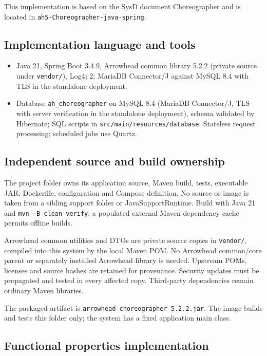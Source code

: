 \documentclass[a4paper]{arrowhead}
\begin{document}
This implementation is based on the SysD document Choreographer \cite{cho-sysd} and is located in \texttt{ah5-Choreographer-java-spring}.

\subsection{Implementation language and tools}
\begin{itemize}
\item Java 21, Spring Boot 3.4.9, Arrowhead common library 5.2.2 (private source under \texttt{vendor/}), Log4j 2; MariaDB Connector/J against MySQL 8.4 with TLS in the standalone deployment.
\item Database \texttt{ah\_\allowbreak{}choreographer} on MySQL 8.4 (MariaDB Connector/J, TLS with server verification in the standalone deployment), schema validated by Hibernate; SQL scripts in \texttt{src/\allowbreak{}main/\allowbreak{}resources/\allowbreak{}database}. Stateless request processing; scheduled jobs use Quartz.
\end{itemize}

\subsection{Independent source and build ownership}
The project folder owns its application source, Maven build, tests, executable JAR, Dockerfile, configuration and Compose definition. No source or image is taken from a sibling support folder or JavaSupportRuntime. Build with Java 21 and \texttt{mvn -B clean verify}; a populated external Maven dependency cache permits offline builds.

Arrowhead common utilities and DTOs are private source copies in \texttt{vendor/}, compiled into this system by the local Maven POM. No Arrowhead common/core parent or separately installed Arrowhead library is needed. Upstream POMs, licenses and source hashes are retained for provenance. Security updates must be propagated and tested in every affected copy. Third-party dependencies remain ordinary Maven libraries.

The packaged artifact is \texttt{arrowhead-\allowbreak{}choreographer-5.2.2.jar}. The image builds and tests this folder only; the system has a fixed application main class.

\subsection{Functional properties implementation}
\end{document}
